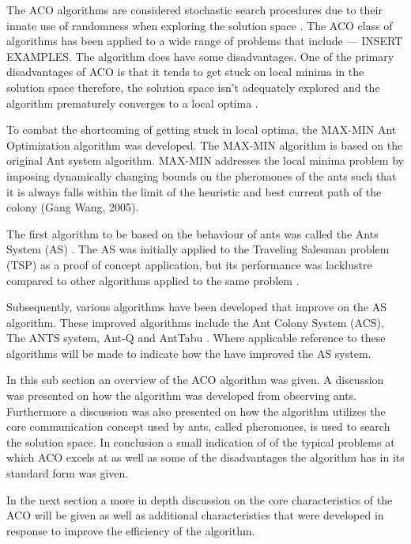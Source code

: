 The ACO algorithms are considered stochastic search procedures due to their innate use of randomness when exploring the solution space \cite{ACOSurvey,ImpACOComplex}. The ACO class of algorithms has been applied to a wide range of problems that include --- INSERT EXAMPLES. The algorithm does have some disadvantages. One of the primary disadvantages of ACO is that it tends to get stuck on local minima in the solution space therefore, the solution space isn't adequately explored and the algorithm prematurely converges to a local optima \cite{ImpACOComplex}.

To combat the shortcoming of getting stuck in local optima, the MAX-MIN Ant Optimization algorithm was developed. The MAX-MIN algorithm is based on the original Ant system algorithm. MAX-MIN addresses the local minima problem by imposing dynamically changing bounds on the pheromones of the ants such that it is always falls within the limit of the heuristic and best current path of the colony (Gang Wang, 2005).

The first algorithm to be based on the behaviour of ants was called the Ants System (AS) \cite{CompuIntelligenceIntro,AntIntroTrends}. The AS was initially applied to the Traveling Salesman problem (TSP) as a proof of concept application, but its performance was lacklustre compared to other algorithms applied to the same problem \cite{CompuIntelligenceIntro,AntIntroTrends}. 

Subsequently, various algorithms have been developed that improve on the AS algorithm. These improved algorithms include the Ant Colony System (ACS), The ANTS system, Ant-Q and AntTabu \cite{CompuIntelligenceIntro,AntIntroTrends}. Where applicable reference to these algorithms will be made to indicate how the have improved the AS system.

In this sub section an overview of the ACO algorithm was given. A discussion was presented on how the algorithm was developed from observing ants. Furthermore a discussion was also presented on how the algorithm utilizes the core communication concept used by ants, called pheromones, is used to search the solution space. In conclusion a small indication of of the typical problems at which ACO excels at as well as some of the disadvantages the algorithm has in its standard form was given.

In the next section a more in depth discussion on the core characteristics of the ACO will be given as well as additional characteristics that were developed in response to improve the efficiency of the algorithm.

